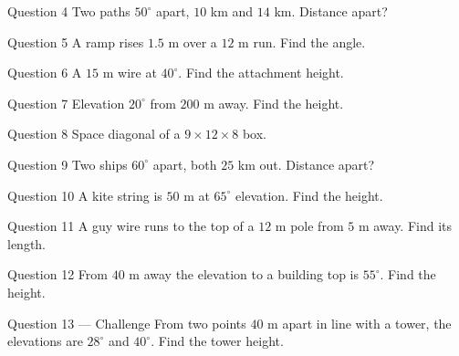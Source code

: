 \documentclass[11pt]{article}
\begin{document}
\begin{qbox}{Question 4}
Two paths $50^\circ$ apart, $10$ km and $14$ km. Distance apart?\workspace{3cm}
\end{qbox}

\begin{qbox}{Question 5}
A ramp rises $1.5$ m over a $12$ m run. Find the angle.\workspace{2.4cm}
\end{qbox}

\begin{qbox}{Question 6}
A $15$ m wire at $40^\circ$. Find the attachment height.\workspace{2.4cm}
\end{qbox}

\begin{qbox}{Question 7}
Elevation $20^\circ$ from $200$ m away. Find the height.\workspace{3cm}
\end{qbox}

\begin{qbox}{Question 8}
Space diagonal of a $9\times12\times8$ box.\workspace{3cm}
\end{qbox}

\begin{qbox}{Question 9}
Two ships $60^\circ$ apart, both $25$ km out. Distance apart?\workspace{3cm}
\end{qbox}

\begin{qbox}{Question 10}
A kite string is $50$ m at $65^\circ$ elevation. Find the height.\workspace{2.4cm}
\end{qbox}

\begin{qbox}{Question 11}
A guy wire runs to the top of a $12$ m pole from $5$ m away. Find its length.\workspace{2.4cm}
\end{qbox}

\begin{qbox}{Question 12}
From $40$ m away the elevation to a building top is $55^\circ$. Find the height.\workspace{3cm}
\end{qbox}

\begin{qbox}{Question 13 --- Challenge}
From two points $40$ m apart in line with a tower, the elevations are $28^\circ$ and $40^\circ$. Find the tower height.\workspace{4cm}
\end{qbox}

\clearpage
{}
\end{document}
